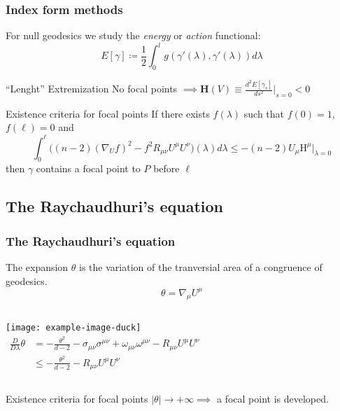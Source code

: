 \documentclass[handout]{beamer}
\begin{document}
	\begin{frame}
		\frametitle{Index form methods}
		For null geodesics we study the \emph{energy} or \emph{action} functional:
		\[
			E[\gamma] \coloneqq \frac{1}{2}\int_{0}^{l} g(\gamma'(\lambda), \gamma'(\lambda))d\lambda	
		\]
		\begin{ideablock}{``Lenght'' Extremization}
			\centering
			No focal points \(\implies \textbf{H}(V) \equiv\frac{d^2E[\gamma_s]}{ds^2}\Big\vert_{s = 0} < 0\)
		\end{ideablock}
	
		\begin{theoblock}{Existence criteria for focal points}
			If there exists \(f(\lambda)\) such that \(f(0) = 1\), \(f(\ell) = 0\) and
			\[
				\int_{0}^{\ell} \big((n -2)(\nabla_Uf)^2 - f^2R_{\mu\nu}U^{\mu}U^{\nu} \big)(\lambda) d\lambda\le -(n-2)U_{\mu}\mathrm{H}^{\mu}\Big\vert_{\lambda = 0}	
			\]
			then \(\gamma\) contains a focal point to \(P\) before \(\ell\)
		\end{theoblock}
	\end{frame}

	\subsection{The Raychaudhuri's equation}
	\begin{frame}
		\frametitle{The Raychaudhuri's equation}
		\begin{defblock}{The expansion}
			\(\theta\) is the variation of the tranversial area of a congruence of geodesics.
			\[
			\theta = \nabla_{\mu}U^{\mu}	
			\]
		\end{defblock}
		\vskip 10pt
		\begin{columns}
			\column{0.2\textwidth}
			\centering
				\texttt{[image: example-image-duck]}
			\column{0.8\textwidth}
			\begin{align*}
				\frac{D}{D\lambda}\theta &= -\frac{\theta^2}{d - 2} - \sigma_{\mu\nu}\sigma^{\mu\nu} + \omega_{\mu\nu}\omega^{\mu\nu}  - R_{\mu\nu}U^{\mu}U^{\nu} \\
				&\le -\frac{\theta^2}{d - 2} - R_{\mu\nu}U^{\mu}U^{\nu}
			\end{align*}
		\end{columns}
		\vskip 10pt
		\begin{ideablock}{Existence criteria for focal points}
			\centering
			\(\vert\theta\vert \rightarrow +\infty \implies \) 
			a focal point is developed.
		\end{ideablock}
	\end{frame}
\end{document}
